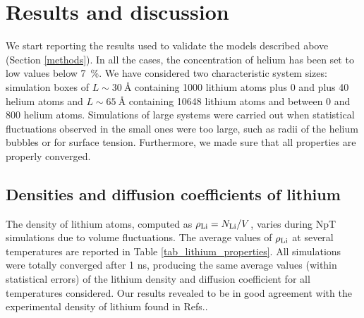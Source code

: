 \documentclass[jcp,amsmath,amssymb,preprint]{revtex4-1}
\begin{document}
\section{\label{res} Results and discussion}

We start reporting the results used to validate the models described above (Section \ref{methods}). In all the cases, the concentration of helium has been set to low values below 7~\%.  We have considered two characteristic system sizes: simulation boxes of $L \sim \SI{30}{\angstrom}$ containing 1000 lithium atoms plus 0 and plus 40 helium atoms and $L \sim \SI{65}{\angstrom}$ containing 10648 lithium atoms and between 0 and 800 helium atoms.  Simulations of large systems were carried out when statistical fluctuations observed in the small ones were too large,  such as radii of the helium bubbles or for surface tension. Furthermore, we made sure that all properties are properly converged. 

\subsection{\label{dd} Densities and diffusion coefficients of lithium}

The density of lithium atoms, computed as $\rho_{\rm Li} = N_{\rm Li} / V$, varies during NpT simulations due to volume fluctuations. The average values of $\rho_{\rm Li}$ at several temperatures are reported in Table \ref{tab_lithium_properties}.  All simulations were totally converged after 1 ns, producing the same average values (within statistical errors) of the lithium density and diffusion coefficient for all temperatures considered.  Our results revealed to be in good agreement with the experimental density of lithium found in Refs.\cite{zinkle1998summary,davison1968compilation}. 
\end{document}
